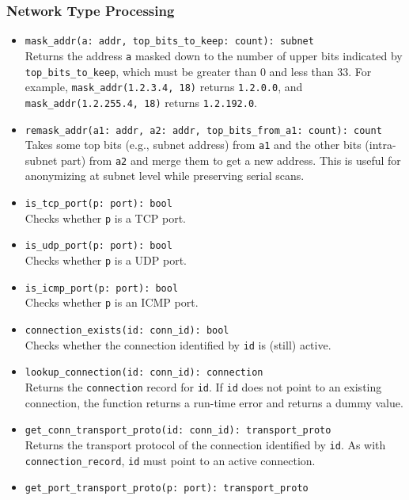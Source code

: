 \documentclass[10pt,landscape]{article}
\newcommand{\verbose}[1]{#1}
\newcommand{\verbose}[1]{}
\begin{document}
\begin{multicols*}{2}
\subsubsection*{Network Type Processing}

\begin{itemize}
  \item \verb|mask_addr(a: addr, top_bits_to_keep: count): subnet|\\
    Returns the address \verb|a| masked down to the number of upper bits
    indicated by \verb|top_bits_to_keep|, which must be greater than 0 and less
    than 33. For example, \verb|mask_addr(1.2.3.4, 18)| returns \verb|1.2.0.0|,
    and \verb|mask_addr(1.2.255.4, 18)| returns \verb|1.2.192.0|.
  \item \verb|remask_addr(a1: addr, a2: addr, top_bits_from_a1: count): count|\\
    Takes some top bits (e.g., subnet address) from \texttt{a1} and the other
    bits (intra-subnet part) from \texttt{a2} and merge them to get a new
    address. This is useful for anonymizing at subnet level while preserving
    serial scans.
  \item \verb|is_tcp_port(p: port): bool|\\
    Checks whether \texttt{p} is a TCP port.
  \item \verb|is_udp_port(p: port): bool|\\
    Checks whether \texttt{p} is a UDP port.
  \item \verb|is_icmp_port(p: port): bool|\\
    Checks whether \texttt{p} is an ICMP port.
  \item \verb|connection_exists(id: conn_id): bool|\\
    Checks whether the connection identified by \texttt{id} is (still) active.
  \item \verb|lookup_connection(id: conn_id): connection|\\
    Returns the \texttt{connection} record for \texttt{id}. If
    \texttt{id} does not point to an existing connection, the function returns
    a run-time error and returns a dummy value.
\verbose{
  \item \verb|get_conn_transport_proto(id: conn_id): transport_proto|\\
    Returns the transport protocol of the connection identified by \texttt{id}.
    As with \verb|connection_record|, \texttt{id} must point to an active
    connection.
  \item \verb|get_port_transport_proto(p: port): transport_proto|\\
}
\end{itemize}
\end{multicols*}
\end{document}
